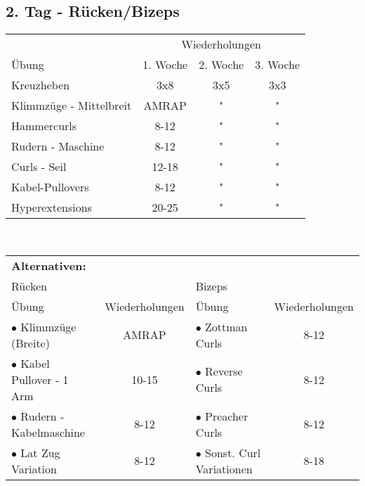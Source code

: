 \documentclass[10pt,a4paper]{article}
\begin{document}
	\subsection{2. Tag - Rücken/Bizeps}
		\begin{tabular}{l||c|c|c}
			& \multicolumn{3}{c}{Wiederholungen} \\ 
			Übung & 1. Woche & 2. Woche & 3. Woche \\ 
			\hline
			\hline 
			Kreuzheben & 3x8 & 3x5 & 3x3 \\ 
			\hline 
			Klimmzüge - Mittelbreit & AMRAP & " & " \\
			\hline 
			Hammercurls & 8-12 & " & " \\ 
			\hline 
			Rudern - Maschine & 8-12 & " & " \\ 
			\hline 
			Curls - Seil	& 12-18	& "	& "	\\
			\hline 
			Kabel-Pullovers	& 8-12 & " & " \\ 
			\hline 
			Hyperextensions	& 20-25	& " & " \\ 
		\end{tabular} 
		\vspace{1cm}\\
		\begin{tabular}{lc|lc}
			\multicolumn{4}{l}{\textbf{Alternativen:}}	\\
			\multicolumn{2}{l}{Rücken} & \multicolumn{2}{l}{Bizeps} \\ 
			\hline
			\midrule
			Übung	& Wiederholungen	& Übung	& Wiederholungen	\\
			$\bullet$ Klimmzüge (Breite)	& AMRAP	& $\bullet$ Zottman Curls	& 8-12	\\
			$\bullet$ Kabel Pullover - 1 Arm	& 10-15	& $\bullet$ Reverse Curls	& 8-12	\\
			$\bullet$ Rudern - Kabelmaschine	& 8-12	& $\bullet$ Preacher Curls	& 8-12	\\
			$\bullet$ Lat Zug Variation	& 8-12	& $\bullet$ Sonst. Curl Variationen	& 8-18 \\
		\end{tabular}
\end{document}
